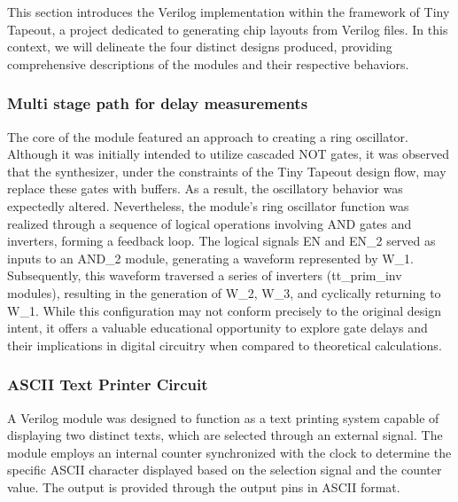 This section introduces the Verilog implementation within the framework of Tiny Tapeout, a project dedicated to generating chip layouts from Verilog files. In this context, we will delineate the four distinct designs produced, providing comprehensive descriptions of the modules and their respective behaviors.

\subsubsection{Multi stage path for delay measurements}
The core of the module featured an approach to creating a ring oscillator. Although it was initially intended to utilize cascaded NOT gates, it was observed that the synthesizer, under the constraints of the Tiny Tapeout design flow, may replace these gates with buffers. As a result, the oscillatory behavior was expectedly altered. Nevertheless, the module's ring oscillator function was realized through a sequence of logical operations involving AND gates and inverters, forming a feedback loop. The logical signals EN and EN\_2 served as inputs to an AND\_2 module, generating a waveform represented by W\_1. Subsequently, this waveform traversed a series of inverters (tt\_prim\_inv modules), resulting in the generation of W\_2, W\_3, and cyclically returning to W\_1. While this configuration may not conform precisely to the original design intent, it offers a valuable educational opportunity to explore gate delays and their implications in digital circuitry when compared to theoretical calculations.\\

\subsubsection{ASCII Text Printer Circuit}
A Verilog module was designed to function as a text printing system capable of displaying two distinct texts, which are selected through an external signal. The module employs an internal counter synchronized with the clock to determine the specific ASCII character displayed based on the selection signal and the counter value. The output is provided through the output pins in ASCII format.\\

